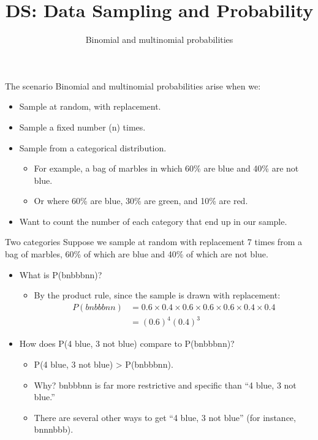 \documentclass[aspectratio=169]{../latex_main/tntbeamer}  %
\title[Binomial and Multinomial]{DS: Data Sampling and Probability}
\subtitle{Binomial and multinomial probabilities}
\begin{document}
	
	\maketitle
	
	
	\begin{frame}{The scenario}
	Binomial and multinomial probabilities arise when we:
	\begin{itemize}
	    \item Sample at random, with replacement.
	    \item Sample a fixed number (n) times.
	    \item Sample from a categorical distribution.
	    \begin{itemize}
	        \item For example, a bag of marbles in which 60\% are blue and 40\% are not blue.
	        \item Or where 60\% are blue, 30\% are green, and 10\% are red.
	    \end{itemize}
	    \item Want to count the number of each category that end up in our sample.
	\end{itemize}

	\end{frame}
	
	
	\begin{frame}{Two categories}
	Suppose we sample at random with replacement 7 times from a bag of marbles, 60\% of which are blue and 40\% of which are not blue.

	\begin{itemize}
	    \item What is P(bnbbbnn)?
	    \begin{itemize}
	        \item By the product rule, since the sample is drawn with replacement:
            \begin{align*}
                P(bnbbbnn) &= 0.6 \times 0.4 \times 0.6 \times 0.6 \times 0.6 \times 0.4 \times 0.4 \\
                &= (0.6)^4 (0.4)^3
            \end{align*}
	    \end{itemize}
	    \item How does P(4 blue, 3 not blue) compare to P(bnbbbnn)?
	    \begin{itemize}
	        \item P(4 blue, 3 not blue) > P(bnbbbnn).
	        \item Why? bnbbbnn is far more restrictive and specific than “4 blue, 3 not blue.”
	        \item There are several other ways to get “4 blue, 3 not blue” (for instance, bnnnbbb).
	    \end{itemize}
	\end{itemize}

	\end{frame}
	
\end{document}
